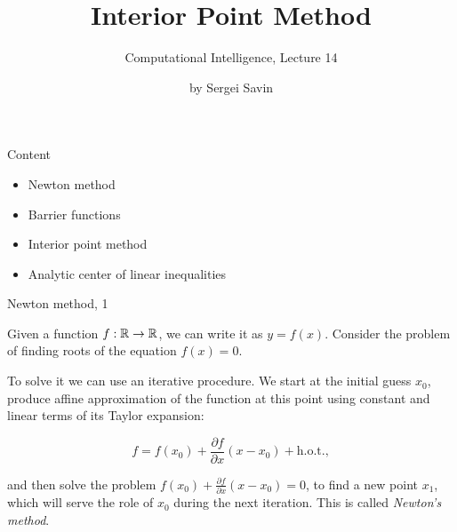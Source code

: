 \documentclass{beamer}
\title{Interior Point Method}
\subtitle{Computational Intelligence, Lecture 14}
\author{by Sergei Savin}
\date{\mydate}
\begin{document}
\maketitle


\begin{frame}{Content}

\begin{itemize}
	\item Newton method
	\item Barrier functions
	\item Interior point method
	\item Analytic center of linear inequalities
\end{itemize}

\end{frame}





\begin{frame}{Newton method, 1}
	\begin{flushleft}
		
		Given a function $f: \mathbb{R} \rightarrow \mathbb{R}$, we can write it as $y = f(x)$. Consider the problem of finding roots of the equation $f(x) = 0$.
		
		\bigskip
		
		To solve it we can use an iterative procedure. We start at the initial guess $x_0$, produce affine approximation of the function at this point using constant and linear terms of its Taylor expansion:
		
		\begin{equation}
			f = f(x_0) + \frac{\partial f}{\partial x} (x - x_0) + \text{h.o.t.},
		\end{equation}
		
		and then solve the problem $f(x_0) + \frac{\partial f}{\partial x} (x - x_0) = 0$, to find a new point $x_1$, which will serve the role of $x_0$ during the next iteration. This is called \emph{Newton's method}.
		
	\end{flushleft}
\end{frame}
\end{document}
